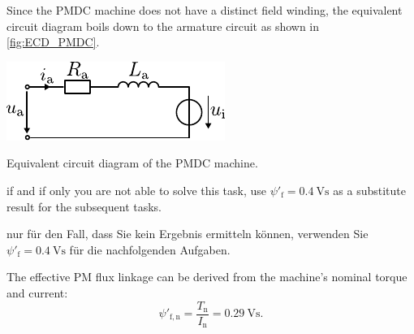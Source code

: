 

\begin{solutionblock}
    Since the PMDC machine does not have a distinct field winding, the equivalent circuit diagram boils down to the armature circuit as shown in \autoref{fig:ECD_PMDC}.
    \begin{solutionfigure}[ht]
        \centering
        \includegraphics[width=0.45\linewidth]{fig/ECD_PMDC.pdf}
        \caption{Equivalent circuit diagram of the PMDC machine.}
        \label{fig:ECD_PMDC}
    \end{solutionfigure}
\end{solutionblock}

%
\begin{hintblock}
    if and if only you are not able to solve this task, use $\psi'_\mathrm{f} = \SI{0.4}{\volt\second}$ as a substitute result for the subsequent tasks.
\end{hintblock}

%
\begin{germanhintblock}
    nur für den Fall, dass Sie kein Ergebnis ermitteln können, verwenden Sie $\psi'_\mathrm{f} =\SI{0.4}{\volt\second}$ für die nachfolgenden Aufgaben.
\end{germanhintblock}


\begin{solutionblock}
    The effective PM flux linkage can be derived from the machine's nominal torque and current:
    $$
        \psi'_\mathrm{f,n} = \frac{T_\mathrm{n}}{I_\mathrm{n}}=\SI{0.29}{\volt\second}.
    $$
\end{solutionblock}



